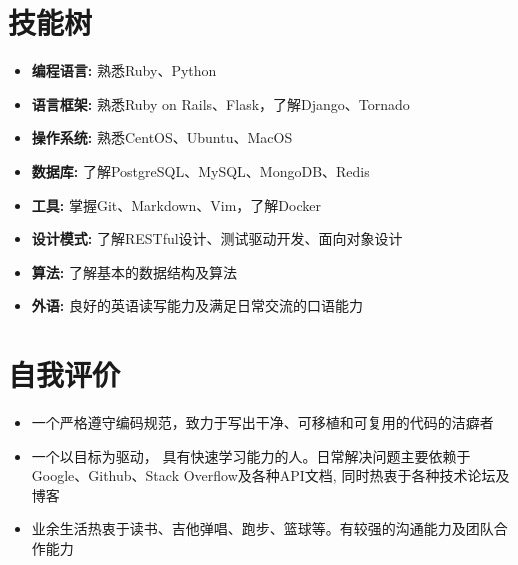 \documentclass[11pt, a4paper,sans]{moderncv}     %
\begin{document}
\section{\yahei 技能树}
\begin{itemize}
  \item{\yahei \textbf{编程语言:} 熟悉Ruby、Python}
  \item{\yahei \textbf{语言框架:} 熟悉Ruby on Rails、Flask，了解Django、Tornado}
  \item{\yahei \textbf{操作系统:} 熟悉CentOS、Ubuntu、MacOS}
  \item{\yahei \textbf{数据库:} 了解PostgreSQL、MySQL、MongoDB、Redis}
  \item{\yahei \textbf{工具:} 掌握Git、Markdown、Vim，了解Docker}
  \item{\yahei \textbf{设计模式:} 了解RESTful设计、测试驱动开发、面向对象设计}
  \item{\yahei \textbf{算法:} 了解基本的数据结构及算法}
  \item{\yahei \textbf{外语:} 良好的英语读写能力及满足日常交流的口语能力}
\end{itemize}
\vspace{-8pt}

\section{\yahei 自我评价}

\begin{itemize}
  \item{\yahei 一个严格遵守编码规范，致力于写出干净、可移植和可复用的代码的洁癖者}
  \item{\yahei 一个以目标为驱动， 具有快速学习能力的人。日常解决问题主要依赖于Google、Github、Stack Overflow及各种API文档, 同时热衷于各种技术论坛及博客}
  \item{\yahei 业余生活热衷于读书、吉他弹唱、跑步、篮球等。有较强的沟通能力及团队合作能力}
\end{itemize}
\end{document}
